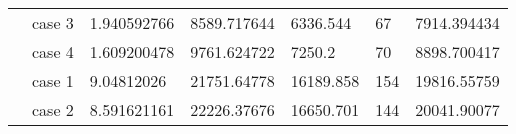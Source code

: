 \begin{table}[]
\begin{tabular}{cllllll}
    \rowcolor[HTML]{FFFFC7} 
    \cellcolor[HTML]{FFFFC7}                                                                                               & case 3                  & 1.940592766                                                                            & 8589.717644                                                                               & 6336.544                                                                            & 67                                                                         & 7914.394434                                                                                \\ \cline{2-7} 
    \rowcolor[HTML]{FFFFC7} 
    \multirow{-4}{*}{\cellcolor[HTML]{FFFFC7}500}                                                                          & case 4                  & 1.609200478                                                                            & 9761.624722                                                                               & 7250.2                                                                              & 70                                                                         & 8898.700417                                                                                \\ \hline
    \rowcolor[HTML]{FFFFC7} 
    \cellcolor[HTML]{FFFFC7}                                                                                               & case 1                  & 9.04812026                                                                             & 21751.64778                                                                               & 16189.858                                                                           & 154                                                                        & 19816.55759                                                                                \\ \cline{2-7} 
    \rowcolor[HTML]{FFFFC7} 
    \cellcolor[HTML]{FFFFC7}                                                                                               & case 2                  & 8.591621161                                                                            & 22226.37676                                                                               & 16650.701                                                                           & 144                                                                        & 20041.90077                                                                                \\ \cline{2-7} 

\end{tabular}
\end{table}
